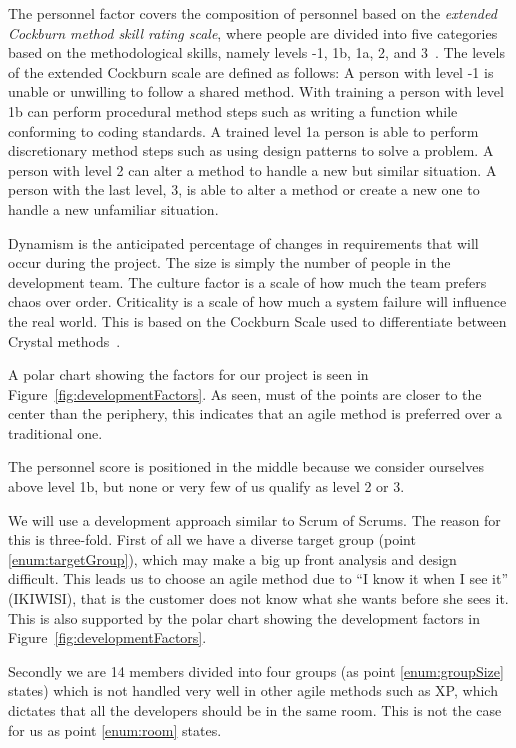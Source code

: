 The personnel factor covers the composition of personnel based on the \textit{extended Cockburn method skill rating scale}, where people are divided into five categories based on the methodological skills, namely levels -1, 1b, 1a, 2, and 3~\cite[p.~34]{boehmTurner}.
The levels of the extended Cockburn scale are defined as follows:
A person with level -1 is unable or unwilling to follow a shared method.
With training a person with level 1b can perform procedural method steps such as writing a function while conforming to coding standards.
A trained level 1a person is able to perform discretionary method steps such as using design patterns to solve a problem.
A person with level 2 can alter a method to handle a new but similar situation.
A person with the last level, 3, is able to alter a method or create a new one to handle a new unfamiliar situation.

Dynamism is the anticipated percentage of changes in requirements that will occur during the project.
The size is simply the number of people in the development team.
The culture factor is a scale of how much the team prefers chaos over order.
Criticality is a scale of how much a system failure will influence the real world.
This is based on the Cockburn Scale used to differentiate between Crystal methods~\cite{Larman04}.



A polar chart showing the factors for our project is seen in Figure~\ref{fig:developmentFactors}.
As seen, must of the points are closer to the center than the periphery, this indicates that an agile method is preferred over a traditional one.

The personnel score is positioned in the middle because we consider ourselves above level 1b, but none or very few of us qualify as level 2 or 3.


We will use a development approach similar to Scrum of Scrums.
The reason for this is three-fold.
First of all we have a diverse target group (point \ref{enum:targetGroup}), which may make a big up front analysis and design difficult.
This leads us to choose an agile method due to ``I know it when I see it'' (IKIWISI), that is the customer does not know what she wants before she sees it.
This is also supported by the polar chart showing the development factors in Figure~\ref{fig:developmentFactors}.

Secondly we are 14 members divided into four groups (as point \ref{enum:groupSize} states) which is not handled very well in other agile methods such as XP, which dictates that all the developers should be in the same room. 
This is not the case for us as point \ref{enum:room} states.

